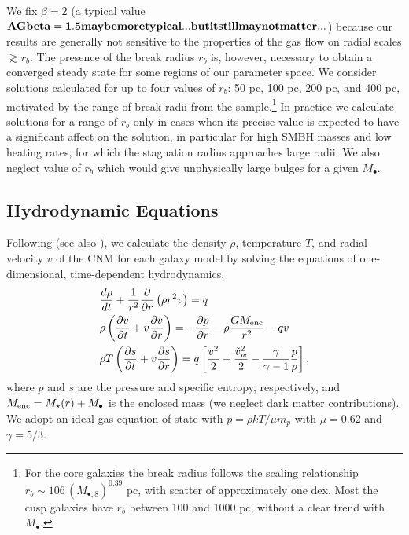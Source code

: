 \documentclass[usenatbib,fleqn]{mn2e}
\newcommand{\rb}{r_b}
\newcommand{\dxdy}[2]{\frac{d #1}{d #2} }
\newcommand{\drhodt}{\dxdy{\rho}{t}}
\newcommand{\ke}{\frac{v^2}{2}}
\newcommand{\kew}{\frac{\tilde{v}_{w}^2}{2}}
\newcommand{\gammaf}{\frac{\gamma}{\gamma-1}}
\newcommand{\cs}{\frac{p}{\rho}}
\newcommand{\Mbh}[1][]{M_{\bullet#1}}
\newcommand{\Mbheight}{M_{\bullet,8}}
\begin{document}
We fix $\beta = 2$ (a typical value ${\bf AG beta=1.5 may be more
  typical...but it still may not matter...}$) because our results are
generally not sensitive to the properties of the gas flow on radial
scales $\gtrsim r_b$. The presence of the break radius $r_{b}$ is,
however, necessary to obtain a converged steady state for some regions
of our parameter space.  We consider solutions calculated for up to
four values of $\rb$: 50 pc, 100 pc, 200 pc, and 400 pc, motivated by
the range of break radii from the \citet{LauerFaber+:2007a}
sample.\footnote{For the core galaxies the break radius follows the
  scaling relationship $\rb\sim 106 \, (\Mbheight)^{0.39}$ pc, with
  scatter of approximately one dex.  Most the cusp galaxies have $\rb$
  between 100 and 1000 pc, without a clear trend with $\Mbh$.}  In
practice we calculate solutions for a range of $\rb$ only in cases
when its precise value is expected to have a significant affect on the
solution, in particular for high SMBH masses and low heating rates,
for which the stagnation radius approaches large radii. We also
neglect value of $r_b$ which would give unphysically large bulges for
a given $\Mbh$.


\subsection{Hydrodynamic Equations}
\label{sec:hydro}

Following \citet{Quataert:2004a} (see also
\citealt{HolzerAxford:1970a,De-ColleGuillochon+:2012a,ShcherbakovWong+:2014a}),
we calculate the density $\rho$, temperature $T$, and radial velocity
$v$ of the CNM for each galaxy model by solving the equations of
one-dimensional, time-dependent hydrodynamics,
\begin{align}
  &\drhodt+\frac{1}{r^2}\frac{\partial}{\partial r}\left(\rho r^2 v\right)=q \label{eq:drhodt}\\
  &\rho \left(\frac{\partial v}{\partial t} + v\frac{\partial
      v}{\partial r}\right) =-\frac{\partial p}{\partial r}- \rho\frac{GM_{\rm enc}}{r^{2}} -q v \label{eq:dvdt}\\
  &\rho T\left(\frac{\partial s}{\partial t} + v\frac{\partial
      s}{\partial r}\right)=q\left[\ke+\kew-\gammaf \cs \right] 
, 
\label{eq:dsdt}
\end{align}
where $p$ and $s$ are the pressure and specific entropy, respectively, and $M_{\rm enc} = M_{\star}(r) + \Mbh$ is the
enclosed mass (we neglect dark matter contributions).  We adopt an ideal gas equation of state with $p = \rho kT/\mu m_p$ with $\mu = 0.62$  and $\gamma = 5/3$. 
\end{document}
